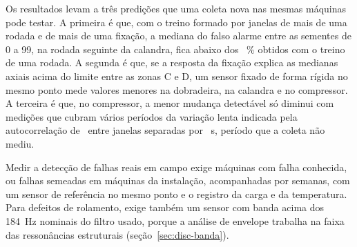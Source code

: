 Os resultados levam a três predições que uma coleta nova nas mesmas máquinas pode testar. A primeira é que, com o treino formado por janelas de mais de uma rodada e de mais de uma fixação, a mediana do falso alarme entre as sementes de 0 a \num{99}, na rodada seguinte da calandra, fica abaixo dos \apTresSementeCalandraMed~\% obtidos com o treino de uma rodada. A segunda é que, se a resposta da fixação explica as medianas axiais acima do limite entre as zonas C e D, um sensor fixado de forma rígida no mesmo ponto mede valores menores na dobradeira, na calandra e no compressor. A terceira é que, no compressor, a menor mudança detectável só diminui com medições que cubram vários períodos da variação lenta indicada pela autocorrelação de \apDoisAutocorrCompressorUm\ entre janelas separadas por \campoCicloUm~s, período que a coleta não mediu.

Medir a detecção de falhas reais em campo exige máquinas com falha conhecida, ou falhas semeadas em máquinas da instalação, acompanhadas por semanas, com um sensor de referência no mesmo ponto e o registro da carga e da temperatura. Para defeitos de rolamento, exige também um sensor com banda acima dos \SI{184}{\hertz} nominais do filtro usado, porque a análise de envelope trabalha na faixa das ressonâncias estruturais (seção~\ref{sec:disc-banda}).
